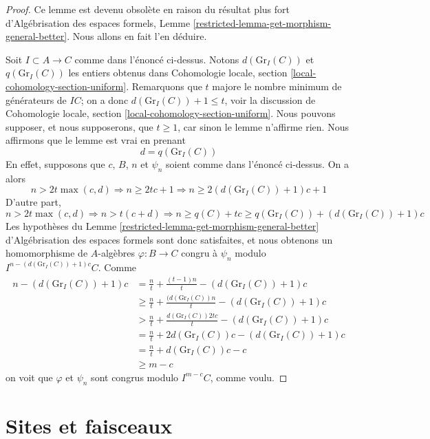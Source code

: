 \begin{proof}
Ce lemme est devenu obsol\`ete en raison du r\'esultat plus fort
d'Alg\'ebrisation des espaces formels,
Lemme \ref{restricted-lemma-get-morphism-general-better}.
Nous allons en fait l'en d\'eduire.

\medskip\noindent
Soit $I \subset A \to C$ comme dans l'\'enonc\'e ci-dessus.
Notons $d(\text{Gr}_I(C))$ et $q(\text{Gr}_I(C))$ les entiers obtenus dans
Cohomologie locale, section \ref{local-cohomology-section-uniform}.
Remarquons que $t$ majore le nombre minimum de g\'en\'erateurs de $IC$;
on a donc $d(\text{Gr}_I(C)) + 1 \leq t$, voir la discussion de
Cohomologie locale, section \ref{local-cohomology-section-uniform}.
Nous pouvons supposer, et nous supposerons, que $t \geq 1$, car sinon le lemme
n'affirme rien. Nous affirmons que le lemme est vrai en prenant
$$
d = q(\text{Gr}_I(C))
$$
En effet, supposons que $c$, $B$, $n$ et $\psi_n$ soient comme dans l'\'enonc\'e
ci-dessus. On a alors
$$
n > 2t\max(c, d) \Rightarrow n \geq 2tc + 1 \Rightarrow
n \geq 2(d(\text{Gr}_I(C)) + 1)c + 1
$$
D'autre part,
$$
n > 2t\max(c, d) \Rightarrow n > t(c + d) \Rightarrow
n \geq q(C) + tc \geq q(\text{Gr}_I(C)) + (d(\text{Gr}_I(C)) + 1)c
$$
Les hypoth\`eses du Lemme \ref{restricted-lemma-get-morphism-general-better}
d'Alg\'ebrisation des espaces formels sont donc satisfaites,
et nous obtenons un homomorphisme de $A$-alg\`ebres
$\varphi : B \to C$ congru \`a $\psi_n$
modulo $I^{n - (d(\text{Gr}_I(C)) + 1)c}C$.
Comme
\begin{align*}
n - (d(\text{Gr}_I(C)) + 1)c
& = \frac{n}{t} + \frac{(t - 1)n}{t} - (d(\text{Gr}_I(C)) + 1)c \\
& \geq \frac{n}{t} + \frac{(d(\text{Gr}_I(C))n}{t} - (d(\text{Gr}_I(C)) + 1)c \\
& > \frac{n}{t} + \frac{d(\text{Gr}_I(C))2tc}{t} - (d(\text{Gr}_I(C)) + 1)c \\
& = \frac{n}{t} + 2d(\text{Gr}_I(C))c - (d(\text{Gr}_I(C)) + 1)c \\
& = \frac{n}{t} + d(\text{Gr}_I(C))c - c \\
& \geq m - c
\end{align*}
on voit que $\varphi$ et $\psi_n$ sont congrus modulo $I^{m - c}C$, comme voulu.
\end{proof}
\section{Sites et faisceaux}
\label{section-sites}

